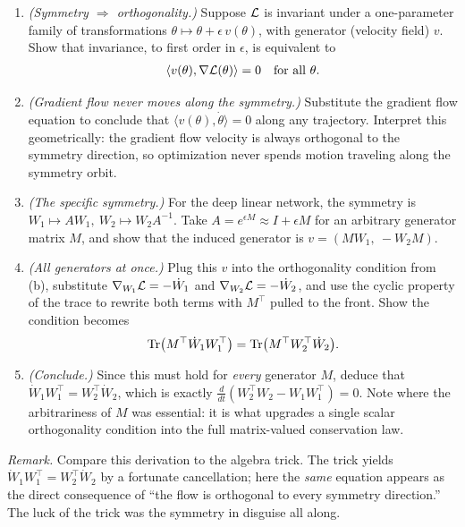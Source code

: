 \begin{enumerate}[label=(\alph*)]
    \item \emph{(Symmetry $\Rightarrow$ orthogonality.)} Suppose $\mathcal{L}$ is
    invariant under a one-parameter family of transformations
    $\theta \mapsto \theta + \epsilon\, v(\theta)$, with generator (velocity field)
    $v$. Show that invariance, to first order in $\epsilon$, is equivalent to
    \begin{align*}
        \langle v(\theta), \nabla\mathcal{L}(\theta)\rangle = 0 \quad \text{for all } \theta.
    \end{align*}
    \item \emph{(Gradient flow never moves along the symmetry.)} Substitute the
    gradient flow equation to conclude that $\langle v(\theta), \dot\theta\rangle = 0$
    along any trajectory. Interpret this geometrically: the gradient flow velocity
    is always orthogonal to the symmetry direction, so optimization never spends
    motion traveling along the symmetry orbit.
    \item \emph{(The specific symmetry.)} For the deep linear network, the symmetry
    is $W_1 \mapsto AW_1,\ W_2 \mapsto W_2 A^{-1}$. Take $A = e^{\epsilon M} \approx
    I + \epsilon M$ for an arbitrary generator matrix $M$, and show that the
    induced generator is $v = (M W_1,\ -W_2 M)$.
    \item \emph{(All generators at once.)} Plug this $v$ into the orthogonality
    condition from (b), substitute $\nabla_{W_1}\mathcal{L} = -\dot W_1$ and
    $\nabla_{W_2}\mathcal{L} = -\dot W_2$, and use the cyclic property of the trace to
    rewrite both terms with $M^\top$ pulled to the front. Show the condition
    becomes
    \begin{align*}
        \Tr\!\big(M^\top \dot W_1 W_1^\top\big) = \Tr\!\big(M^\top W_2^\top \dot W_2\big).
    \end{align*}
    \item \emph{(Conclude.)} Since this must hold for \emph{every} generator $M$,
    deduce that $\dot W_1 W_1^\top = W_2^\top \dot W_2$, which is exactly
    $\frac{d}{dt}(W_2^\top W_2 - W_1 W_1^\top) = 0$. Note where the arbitrariness of
    $M$ was essential: it is what upgrades a single scalar orthogonality condition
    into the full matrix-valued conservation law.
\end{enumerate}

\emph{Remark.} Compare this derivation to the algebra trick. The trick yields
$\dot W_1 W_1^\top = W_2^\top \dot W_2$ by a fortunate cancellation; here the
\emph{same} equation appears as the direct consequence of ``the flow is orthogonal
to every symmetry direction.'' The luck of the trick was the symmetry in disguise
all along.

